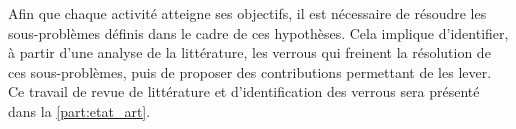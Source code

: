 Afin que chaque activité atteigne ses objectifs, il est nécessaire de résoudre les sous-problèmes définis dans le cadre de ces hypothèses. Cela implique d’identifier, à partir d’une analyse de la littérature, les verrous qui freinent la résolution de ces sous-problèmes, puis de proposer des contributions permettant de les lever. Ce travail de revue de littérature et d’identification des verrous sera présenté dans la \autoref{part:etat_art}.

